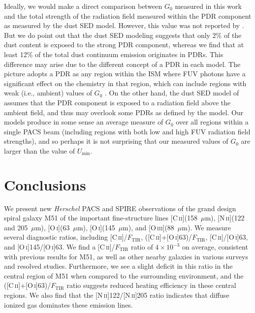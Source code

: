 Ideally, we would make a direct comparison between $G_{0}$ measured in this work and the total strength of the radiation field measured within the PDR component as measured by the dust SED model.  However, this value was not reported by \citet{2012ApJ...755..165M}.  But we do point out that the dust SED modeling suggests that only 2\% of the dust content is exposed to the strong PDR component, whereas we find that at least 12\% of the total dust continuum emission originates in PDRs.  This difference may arise due to the different concept of a PDR in each model.  The \citet{1999ApJ...527..795K} picture adopts a PDR as any region within the ISM where FUV photons have a significant effect on the chemistry in that region, which can include regions with weak (i.e., ambient) values of $G_{0}$ \citep{1985ApJ...291..722T}.  On the other hand, the dust SED model of \citet{2007ApJ...657..810D} assumes that the PDR component is exposed to a radiation field above the ambient field, and thus may overlook some PDRs as defined by the \citet{1999ApJ...527..795K} model.  Our models produce in some sense an average measure of $G_{0}$ over all regions within a single PACS beam (including regions with both low and high FUV radiation field strengths), and so perhaps it is not surprising that our measured values of $G_{0}$ are larger than the value of $U_{\mathrm{min}}$.

\section{Conclusions}\label{conclusions3}
We present new \emph{Herschel} PACS and SPIRE observations of the grand design spiral galaxy M51 of the important fine-structure lines [C\,\textsc{ii}](158~$\mu$m), [N\,\textsc{ii}](122 and 205~$\mu$m), [O\,\textsc{i}](63~$\mu$m), [O\,\textsc{i}](145~$\mu$m), and [O\,\textsc{iii}](88~$\mu$m).  We measure several diagnostic ratios, including [C\,\textsc{ii}]/$F_{\mathrm{TIR}}$, ([C\,\textsc{ii}]+[O\,\textsc{i}]63)/$F_{\mathrm{TIR}}$, [C\,\textsc{ii}]/[O\,\textsc{i}]63, and [O\,\textsc{i}]145/[O\,\textsc{i}]63.  We find a [C\,\textsc{ii}]/$F_{\mathrm{TIR}}$ ratio of $4 \times 10^{-3}$ on average, consistent with previous results for M51, as well as other nearby galaxies in various surveys and resolved studies.  Furthermore, we see a slight deficit in this ratio in the central region of M51 when compared to the surrounding environment, and the ([C\,\textsc{ii}]+[O\,\textsc{i}]63)/$F_{\mathrm{TIR}}$ ratio suggests reduced heating efficiency in these central regions.  We also find that the [N\,\textsc{ii}]122/[N\,\textsc{ii}]205 ratio indicates that diffuse ionized gas dominates these emission lines.

